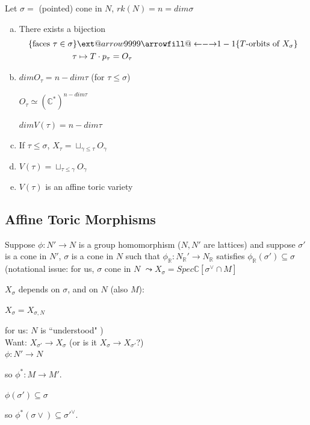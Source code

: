 \documentclass[a4paper,12pt]{amsart}
\makeatletter
\newcommand{\C}{\ensuremath{\mathbb{C}}}
\newcommand{\R}{\ensuremath{\mathbb{R}}}
\newcommand\xleftrightarrow[2][]{%
	\ext@arrow 9999{\longleftrightarrowfill@}{#1}{#2}}
\newcommand\longleftrightarrowfill@{%
	\arrowfill@\leftarrow\relbar\rightarrow}
\makeatother
\begin{document}
\begin{Theorem}
	Let $ \sigma =$ (pointed) cone in $N$, $ rk(N)=n=dim\sigma $
	\begin{enumerate}[a)]
		\item There exists a bijection
		\begin{align*}
			\{\text{faces }\tau \in \sigma\} &\xleftrightarrow{1-1} \{T\text{-orbits of }X_\sigma\}\\
			\tau &\mapsto T\cdot p_\tau = O_\tau
		\end{align*}
		\item $dimO_\tau = n-dim\tau$ (for $\tau \leq \sigma$)
		
		$O_\tau \simeq (\C^*)^{n-dim\tau}$
		
		$dimV(\tau)=n-dim\tau$
		\item If $ \tau \leq \sigma$, $X_\tau=\sqcup_{\gamma\leq \tau} O_\gamma $
		\item $ V(\tau)=\sqcup_{\tau\leq\gamma} O_\gamma $
		\item $ V(\tau) $ is an affine toric variety
	\end{enumerate}
\end{Theorem}

\subsection{Affine Toric Morphisms}

Suppose $\phi:N'\to N$ is a group homomorphism ($N, N'$ are lattices) and suppose $\sigma'$ is a cone in $N'$, $\sigma$ is a cone in $N$ such that $\phi_\R: N_\R'\to N_\R$ satisfies $\phi_\R(\sigma')\subseteq \sigma$
\\

(notational issue: for us, $\sigma$ cone in $N$ $\leadsto X_\sigma = Spec\C[\sigma^\vee \cap M]$

$X_\sigma$ depends on $\sigma$, and on $N$ (also $M$):

$X_\sigma = X_{\sigma,N}$

for us: $N$ is ``understood"
)
\\

Want: $X_{\sigma'}\to X_\sigma$ (or is it $X_\sigma \to X_{\sigma'}$?)
\\

$ \phi: N'\to N $

so  $ \phi^*: M\to M' $.

$ \phi(\sigma')\subseteq \sigma $

so $\phi^*(\sigma\vee)\subseteq \sigma'^\vee$.
\end{document}
